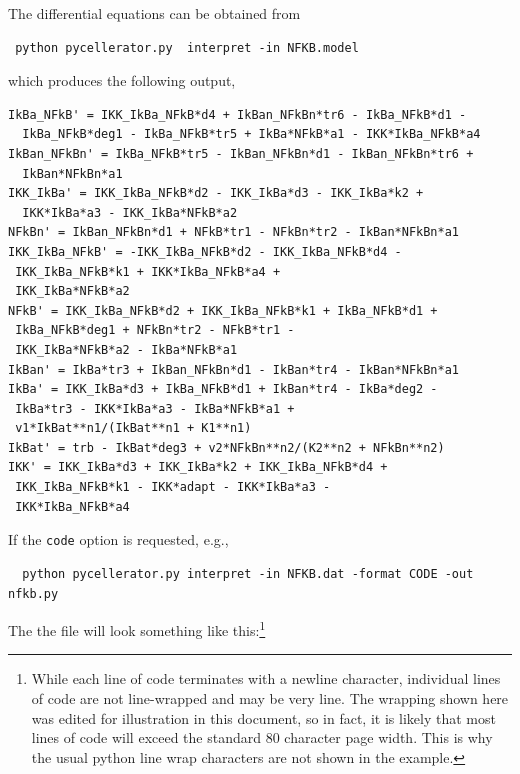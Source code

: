 The differential equations can be obtained from 
\begin{lstlisting}
 python pycellerator.py  interpret -in NFKB.model
\end{lstlisting}
which produces the following output, 
\begin{lstlisting}
IkBa_NFkB' = IKK_IkBa_NFkB*d4 + IkBan_NFkBn*tr6 - IkBa_NFkB*d1 - 
  IkBa_NFkB*deg1 - IkBa_NFkB*tr5 + IkBa*NFkB*a1 - IKK*IkBa_NFkB*a4
IkBan_NFkBn' = IkBa_NFkB*tr5 - IkBan_NFkBn*d1 - IkBan_NFkBn*tr6 + 
  IkBan*NFkBn*a1
IKK_IkBa' = IKK_IkBa_NFkB*d2 - IKK_IkBa*d3 - IKK_IkBa*k2 + 
  IKK*IkBa*a3 - IKK_IkBa*NFkB*a2
NFkBn' = IkBan_NFkBn*d1 + NFkB*tr1 - NFkBn*tr2 - IkBan*NFkBn*a1
IKK_IkBa_NFkB' = -IKK_IkBa_NFkB*d2 - IKK_IkBa_NFkB*d4 - 
 IKK_IkBa_NFkB*k1 + IKK*IkBa_NFkB*a4 + 
 IKK_IkBa*NFkB*a2
NFkB' = IKK_IkBa_NFkB*d2 + IKK_IkBa_NFkB*k1 + IkBa_NFkB*d1 + 
 IkBa_NFkB*deg1 + NFkBn*tr2 - NFkB*tr1 -
 IKK_IkBa*NFkB*a2 - IkBa*NFkB*a1
IkBan' = IkBa*tr3 + IkBan_NFkBn*d1 - IkBan*tr4 - IkBan*NFkBn*a1
IkBa' = IKK_IkBa*d3 + IkBa_NFkB*d1 + IkBan*tr4 - IkBa*deg2 - 
 IkBa*tr3 - IKK*IkBa*a3 - IkBa*NFkB*a1 +
 v1*IkBat**n1/(IkBat**n1 + K1**n1)
IkBat' = trb - IkBat*deg3 + v2*NFkBn**n2/(K2**n2 + NFkBn**n2)
IKK' = IKK_IkBa*d3 + IKK_IkBa*k2 + IKK_IkBa_NFkB*d4 + 
 IKK_IkBa_NFkB*k1 - IKK*adapt - IKK*IkBa*a3 -
 IKK*IkBa_NFkB*a4
\end{lstlisting}
If the {\tt code} option is requested, e.g., 
\begin{lstlisting}
  python pycellerator.py interpret -in NFKB.dat -format CODE -out nfkb.py
\end{lstlisting}
The the file  will look something like this:\footnote{While each line of code terminates with a newline character, individual lines of code are not line-wrapped and may be very line. The wrapping shown here was edited for illustration in this document, so in fact, it is likely that most lines of code will exceed the standard 80 character page width. This is why the usual python line wrap characters are not shown in the example.}

